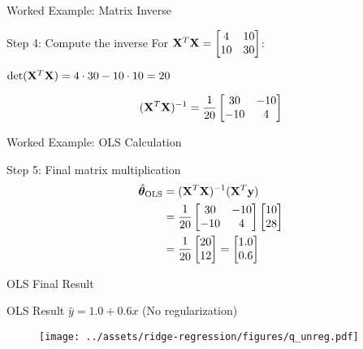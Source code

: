 \documentclass{beamer}
\begin{document}
\begin{frame}{Worked Example: Matrix Inverse}
\begin{codebox}{Step 4: Compute the inverse}
For $\mathbf{X}^T\mathbf{X} = \begin{bmatrix} 4 & 10 \\ 10 & 30 \end{bmatrix}$:

$\operatorname{det}(\mathbf{X}^T\mathbf{X}) = 4 \cdot 30 - 10 \cdot 10 = 20$

$$(\mathbf{X}^{T}\mathbf{X})^{-1} = \frac{1}{20} \begin{bmatrix} 30 & -10 \\ -10 & 4 \end{bmatrix}$$
\end{codebox}
\end{frame}

\begin{frame}{Worked Example: OLS Calculation}
\begin{codebox}{Step 5: Final matrix multiplication}
\begin{align*}
\hat{\boldsymbol{\theta}}_{\text{OLS}} &= (\mathbf{X}^{T}\mathbf{X})^{-1}(\mathbf{X}^{T}\mathbf{y}) \\
&= \frac{1}{20} \begin{bmatrix} 30 & -10 \\ -10 & 4 \end{bmatrix} \begin{bmatrix} 10 \\ 28 \end{bmatrix} \\
&= \frac{1}{20} \begin{bmatrix} 20 \\ 12 \end{bmatrix} = \begin{bmatrix} 1.0 \\ 0.6 \end{bmatrix}
\end{align*}
\end{codebox}
\end{frame}

\begin{frame}{OLS Final Result}
\begin{theorembox}{OLS Result}
$\hat{y} = 1.0 + 0.6x$ \quad (No regularization)
\end{theorembox}

\begin{figure}
\texttt{[image: ../assets/ridge-regression/figures/q\_unreg.pdf]}
\end{figure}
\end{frame}
\end{document}
